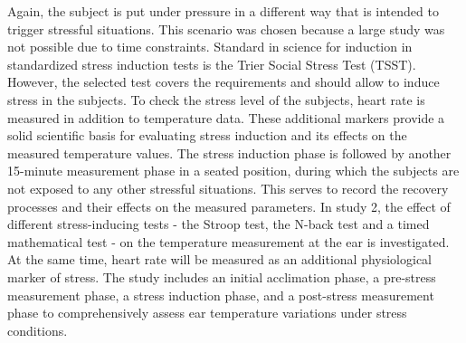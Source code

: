 Again, the subject is put under pressure in a different way that is intended to trigger stressful situations.
This scenario was chosen because a large study was not possible due to time constraints. 
Standard in science for induction in standardized stress induction tests is the Trier Social Stress Test (TSST). 
However, the selected test covers the requirements and should allow to induce stress in the subjects.
To check the stress level of the subjects, heart rate is measured in addition to temperature data. 
These additional markers provide a solid scientific basis for evaluating stress induction and its effects on the measured temperature values.
The stress induction phase is followed by another 15-minute measurement phase in a seated position, during which the subjects are not exposed to any other stressful situations. 
This serves to record the recovery processes and their effects on the measured parameters. 
In study 2, the effect of different stress-inducing tests - the Stroop test, the N-back test and a timed mathematical test - on the temperature measurement at the ear is investigated.
At the same time, heart rate will be measured as an additional physiological marker of stress. 
The study includes an initial acclimation phase, a pre-stress measurement phase, a stress induction phase, and a post-stress measurement phase to comprehensively assess ear temperature variations under stress conditions.